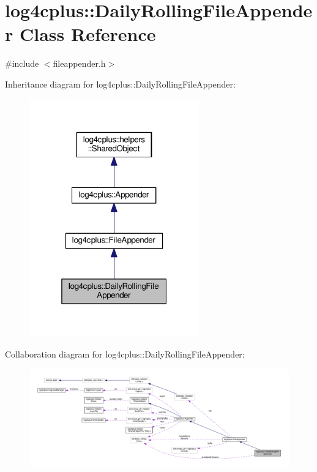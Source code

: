 \hypertarget{classlog4cplus_1_1DailyRollingFileAppender}{\section{log4cplus\-:\-:Daily\-Rolling\-File\-Appender Class Reference}
\label{classlog4cplus_1_1DailyRollingFileAppender}
}


{\ttfamily \#include $<$fileappender.\-h$>$}



Inheritance diagram for log4cplus\-:\-:Daily\-Rolling\-File\-Appender\-:
\nopagebreak
\begin{figure}[H]
\begin{center}
\leavevmode
\includegraphics[width=208pt]{classlog4cplus_1_1DailyRollingFileAppender__inherit__graph}
\end{center}
\end{figure}


Collaboration diagram for log4cplus\-:\-:Daily\-Rolling\-File\-Appender\-:
\nopagebreak
\begin{figure}[H]
\begin{center}
\leavevmode
\includegraphics[width=350pt]{classlog4cplus_1_1DailyRollingFileAppender__coll__graph}
\end{center}
\end{figure}
